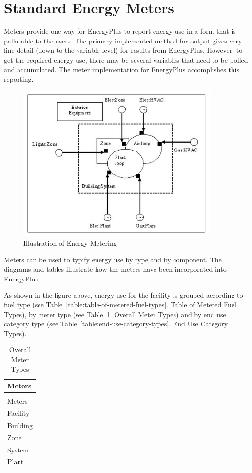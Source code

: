 \section{Standard Energy Meters}\label{standard-energy-meters}

Meters provide one way for EnergyPlus to report energy use in a form that is pallatable to the users. The primary implemented method for output gives very fine detail (down to the variable level) for results from EnergyPlus. However, to get the required energy use, there may be several variables that need to be polled and accumulated. The meter implementation for EnergyPlus accomplishes this reporting.

\begin{figure}[hbtp] %
\centering
\includegraphics[width=0.9\textwidth, height=0.9\textheight, keepaspectratio=true]{media/image024.jpg}
\caption{Illustration of Energy Metering \protect \label{fig:illustration-of-energy-metering}}
\end{figure}

Meters can be used to typify energy use by type and by component. The diagrams and tables illustrate how the meters have been incorporated into EnergyPlus.

As shown in the figure above, energy use for the facility is grouped according to fuel type (see Table~\ref{table:table-of-metered-fuel-types}. Table of Metered Fuel Types), by meter type (see Table~\ref{table:overall-meter-types}. Overall Meter Types) and by end use category type (see Table~\ref{table:end-use-category-types}. End Use Category Types).

\begin{longtable}[c]{@{}l@{}}
\caption{Overall Meter Types \label{table:overall-meter-types}} \tabularnewline
\toprule 
Meters \tabularnewline
\midrule
\endfirsthead

\caption[]{Overall Meter Types} \tabularnewline
\toprule 
Meters \tabularnewline
\midrule
\endhead

Facility \tabularnewline
Building \tabularnewline
Zone \tabularnewline
System \tabularnewline
Plant \tabularnewline
\bottomrule
\end{longtable}

